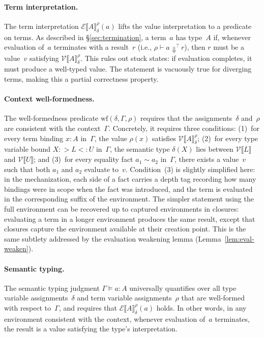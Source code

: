 \documentclass[acmsmall]{acmart}
\begin{document}
\paragraph{Term interpretation.}
The term interpretation $\mathcal{E}\llbracket A \rrbracket_{\delta}^{\rho}(a)$ lifts the value interpretation to a predicate on terms. As described in \S\ref{sec:termination}, a term~$a$ has type~$A$ if, whenever evaluation of~$a$ terminates with a result~$r$ (i.e., $\rho \vdash a \Downarrow^? r$), then $r$ must be a value~$v$ satisfying $\mathcal{V}\llbracket A \rrbracket_{\delta}^{\rho}$. This rules out stuck states: if evaluation completes, it must produce a well-typed value. The statement is vacuously true for diverging terms, making this a partial correctness property.

\paragraph{Context well-formedness.}
The well-formedness predicate $\mathrm{wf}(\delta, \Gamma, \rho)$ requires that the assignments~$\delta$ and~$\rho$ are consistent with the context~$\Gamma$. Concretely, it requires three conditions: (1)~for every term binding $x : A$ in~$\Gamma$, the value $\rho(x)$ satisfies $\mathcal{V}\llbracket A \rrbracket_{\delta}^{\rho}$; (2)~for every type variable bound $X :> L <: U$ in~$\Gamma$, the semantic type $\delta(X)$ lies between $\mathcal{V}\llbracket L \rrbracket$ and $\mathcal{V}\llbracket U \rrbracket$; and (3)~for every equality fact $a_1 \sim a_2$ in~$\Gamma$, there exists a value~$v$ such that both $a_1$ and $a_2$ evaluate to~$v$. Condition~(3) is slightly simplified here: in the mechanization, each side of a fact carries a depth tag recording how many bindings were in scope when the fact was introduced, and the term is evaluated in the corresponding suffix of the environment. The simpler statement using the full environment can be recovered up to captured environments in closures: evaluating a term in a longer environment produces the same result, except that closures capture the environment available at their creation point. This is the same subtlety addressed by the evaluation weakening lemma (Lemma~\ref{lem:eval-weaken}).

\paragraph{Semantic typing.}
The semantic typing judgment $\Gamma \vDash a : A$ universally quantifies over all type variable assignments~$\delta$ and term variable assignments~$\rho$ that are well-formed with respect to~$\Gamma$, and requires that $\mathcal{E}\llbracket A \rrbracket_{\delta}^{\rho}(a)$ holds. In other words, in any environment consistent with the context, whenever evaluation of~$a$ terminates, the result is a value satisfying the type's interpretation.
\end{document}
